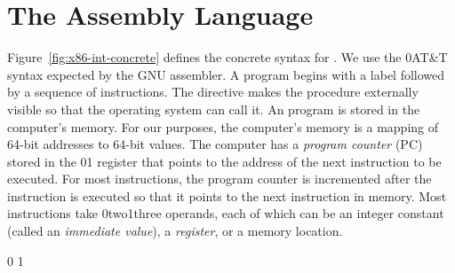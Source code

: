 \documentclass[7x10]{TimesAPriori_MIT}%
\def\xeightysixEd{0}
\def\riscvEd{1}
\def\architecture{1}
\newcommand\ifriscv[1]{\if\architecture\riscvEd{#1}\fi}
\newcommand\ifxeightsix[1]{\if\architecture\xeightysixEd{#1}\fi}
\numberwithin{theorem}{chapter}
\numberwithin{definition}{chapter}
\numberwithin{equation}{chapter}
\begin{document}
\section{The \LangXInt{} Assembly Language}
\label{sec:x86}

Figure~\ref{fig:x86-int-concrete} defines the concrete syntax for
\LangXInt{}.  We use the \ifxeightsix{AT\&T} syntax expected by the GNU
assembler.
%
A program begins with a  label followed by a sequence of
instructions. The  directive makes the  procedure
externally visible so that the operating system can call it.
%
An {\ArchName} program is stored in the computer's memory.  For our purposes,
the computer's memory is a mapping of 64-bit addresses to 64-bit
values.  The computer has a \emph{program counter}
(PC)
stored in the \ifxeightsix{}\ifriscv{} register that points to the address of the next instruction
to be executed.  For most instructions, the program counter is
incremented after the instruction is executed so that it points to the
next instruction in memory. Most {\ArchName} instructions take \ifxeightsix{two}\ifriscv{three} operands,
each of which can be an integer constant (called an \emph{immediate
  value}), a
\emph{register}, or a memory location.

\if\architecture\xeightysixEd
\newcommand{\allregisters}{\key{rsp} \MID \key{rbp} \MID \key{rax} \MID \key{rbx} \MID \key{rcx}
              \MID \key{rdx} \MID \key{rsi} \MID \key{rdi} \MID \\
              && \key{r8} \MID \key{r9} \MID \key{r10}
              \MID \key{r11} \MID \key{r12} \MID \key{r13}
              \MID \key{r14} \MIDn \key{r15}}
\fi
\if\architecture\riscvEd
\newcommand{\allregisters}{\key{sp} \MID \key{fp} \MID \key{ra} \MID
  \key{zero} \MID \key{pc} \MID \\
  && \key{a0} - \key{a7} \MID \key{s2} - \key{s11} \MID \key{t0} - \key{t6}}
\fi
\end{document}
